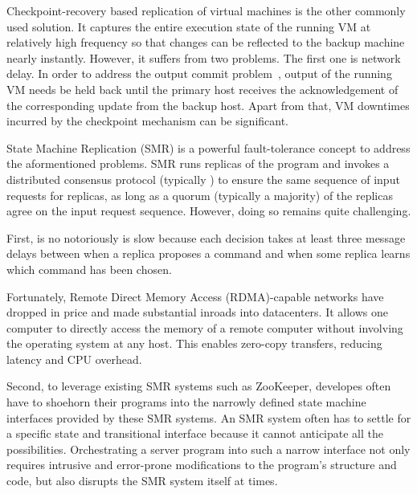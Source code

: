 Checkpoint-recovery based replication of virtual machines is the other commonly used solution. 
It captures the entire execution state of the running VM at relatively high frequency so that 
changes can be reflected to the backup machine nearly instantly. However, it suffers from two 
problems. The first one is network delay. In order to address the output commit 
problem~\cite{strom1987volatile}, output of the running VM needs be held back until the primary 
host receives the acknowledgement of the corresponding update from the backup host. Apart from 
that, VM downtimes incurred by the checkpoint mechanism can be significant.

State Machine Replication (SMR) is a powerful fault-tolerance concept to address the aformentioned 
problems. SMR runs replicas of the program and invokes a distributed consensus protocol (typically \paxos) 
to ensure the same sequence of input requests for replicas, as long as a quorum (typically a majority) 
of the replicas agree on the input request sequence. However, doing so remains quite challenging. 

First, \paxos is no notoriously is slow because each decision takes at least three message delays 
between when a replica proposes a command and when some replica learns which command has been chosen.

Fortunately, Remote Direct Memory Access (RDMA)-capable networks have dropped in price and made 
substantial inroads into datacenters. It allows one computer to directly access the memory of 
a remote computer without involving the operating system at any host. This enables zero-copy 
transfers, reducing latency and CPU overhead.

Second, to leverage existing SMR systems such as ZooKeeper, developes often have to shoehorn their 
programs into the narrowly defined state machine interfaces provided by these SMR systems. An SMR 
system often has to settle for a specific state and transitional interface because it cannot 
anticipate all the possibilities. Orchestrating a server program into such a narrow interface not 
only requires intrusive and error-prone modifications to the program's structure and code, but also 
disrupts the SMR system itself at times.

